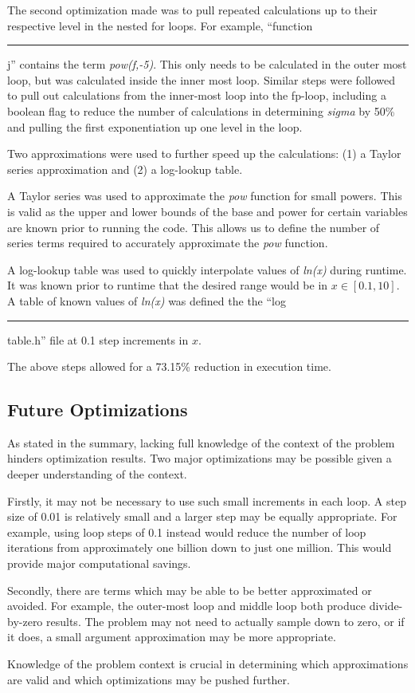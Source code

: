 \documentclass{article}
\newcommand\us[0]{\rule{2mm}{0.15mm}}
\begin{document}
The second optimization made was to pull repeated calculations up to their 
respective level in the nested for loops. For example, ``function\us j'' 
contains the term \emph{pow(f,-5)}. This only needs to be calculated in the 
outer most loop, but was calculated inside the inner most loop. Similar steps
were followed to pull out calculations from the inner-most loop into the 
fp-loop, including a boolean flag to reduce the number of calculations in 
determining \emph{sigma} by 50\% and pulling the first exponentiation up one
level in the loop.

Two approximations were used to further speed up the calculations: (1) a 
Taylor series approximation and (2) a log-lookup table.

A Taylor series was used to approximate the \emph{pow} function for small 
powers. This is valid as the upper and lower bounds of the base and power for
certain variables are known prior to running the code. This allows us to 
define the number of series terms required to accurately approximate the 
\emph{pow} function. 

A log-lookup table was used to quickly interpolate values of \emph{ln(x)} 
during runtime. It was known prior to runtime that the desired range would be in $x\in[0.1,10]$. A table of known values of \emph{ln(x)} was defined the the ``log\us table.h'' file at 0.1 step increments in $x$.

The above steps allowed for a 73.15\% reduction in execution time.


\subsection{Future Optimizations}
As stated in the summary, lacking full knowledge of the context of the problem
hinders optimization results. Two major optimizations may be possible given
a deeper understanding of the context. 

Firstly, it may not be necessary to use such small increments in each loop.
A step size of 0.01 is relatively small and a larger step may be equally 
appropriate. For example, using loop steps of 0.1 instead would reduce the
number of loop iterations from approximately one billion down to just one 
million. This would provide major computational savings.

Secondly, there are terms which may be able to be better approximated or 
avoided. For example, the outer-most loop and middle loop both produce divide-
by-zero results. The problem may not need to actually sample down to zero, or 
if it does, a small argument approximation may be more appropriate. 

Knowledge of the problem context is crucial in determining which 
approximations are valid and which optimizations may be pushed further. 
\end{document}
